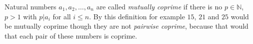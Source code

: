 \documentclass[12pt]{article}
\begin{document}
Natural numbers $a_1,a_2,\dots,a_n$ are called \emph{mutually coprime} if there is no $p\in\mathbb{N}$, $p>1$ with $p|a_i$ for all $i\leq n$. By this definition for example $15$, $21$ and $25$ would be mutually coprime though they are not \emph{pairwise coprime}, because that would  that each pair of these numbers is coprime.
\end{document}
